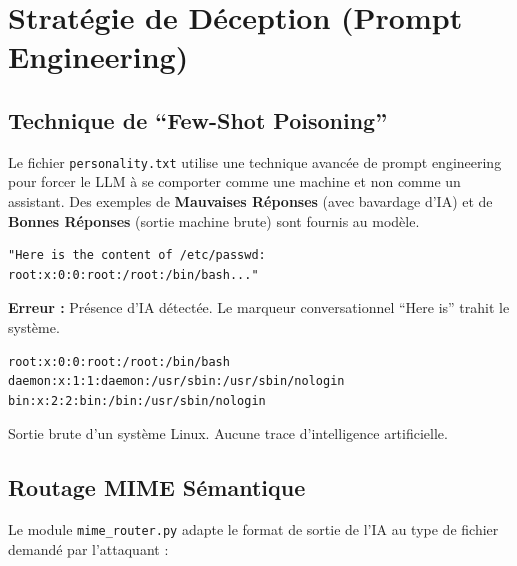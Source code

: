 \documentclass[12pt,a4paper]{article}
\begin{document}
\section{Stratégie de Déception (Prompt Engineering)}

\subsection{Technique de ``Few-Shot Poisoning''}

Le fichier \texttt{personality.txt} utilise une technique avancée de prompt engineering pour forcer le LLM à se comporter comme une machine et non comme un assistant. Des exemples de \textbf{Mauvaises Réponses} (avec bavardage d'IA) et de \textbf{Bonnes Réponses} (sortie machine brute) sont fournis au modèle.

\begin{warnbox}
\begin{lstlisting}[language={}]
"Here is the content of /etc/passwd: 
root:x:0:0:root:/root:/bin/bash..."
\end{lstlisting}
\textbf{Erreur :} Présence d'IA détectée. Le marqueur conversationnel ``Here is'' trahit le système.
\end{warnbox}

\begin{infobox}
\begin{lstlisting}[language={}]
root:x:0:0:root:/root:/bin/bash
daemon:x:1:1:daemon:/usr/sbin:/usr/sbin/nologin
bin:x:2:2:bin:/bin:/usr/sbin/nologin
\end{lstlisting}
Sortie brute d'un système Linux. Aucune trace d'intelligence artificielle.
\end{infobox}

\subsection{Routage MIME Sémantique}

Le module \texttt{mime\_router.py} adapte le format de sortie de l'IA au type de fichier demandé par l'attaquant :
\end{document}
